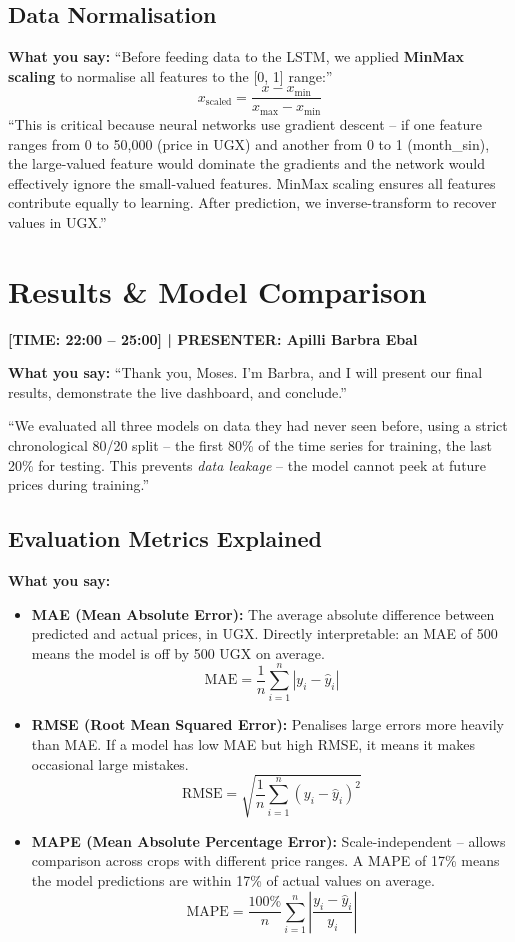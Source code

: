 \documentclass[11pt,a4paper]{article}
\begin{document}
\subsection{Data Normalisation}
\textbf{What you say:}
``Before feeding data to the LSTM, we applied \textbf{MinMax scaling} to normalise all features to the [0, 1] range:''
$$x_{\text{scaled}} = \frac{x - x_{\min}}{x_{\max} - x_{\min}}$$
``This is critical because neural networks use gradient descent -- if one feature ranges from 0 to 50,000 (price in UGX) and another from 0 to 1 (month\_sin), the large-valued feature would dominate the gradients and the network would effectively ignore the small-valued features. MinMax scaling ensures all features contribute equally to learning. After prediction, we inverse-transform to recover values in UGX.''

\newpage
\section{Results \& Model Comparison}
\textcolor{timecolor}{\textbf{[TIME: 22:00 -- 25:00] | PRESENTER: Apilli Barbra Ebal}}

\textbf{What you say:}
``Thank you, Moses. I'm Barbra, and I will present our final results, demonstrate the live dashboard, and conclude.''

``We evaluated all three models on data they had never seen before, using a strict chronological 80/20 split -- the first 80\% of the time series for training, the last 20\% for testing. This prevents \textit{data leakage} -- the model cannot peek at future prices during training.''

\subsection{Evaluation Metrics Explained}
\textbf{What you say:}
\begin{itemize}
    \item \textbf{MAE (Mean Absolute Error):} The average absolute difference between predicted and actual prices, in UGX. Directly interpretable: an MAE of 500 means the model is off by 500 UGX on average.
    $$\text{MAE} = \frac{1}{n}\sum_{i=1}^{n}|y_i - \hat{y}_i|$$
    \item \textbf{RMSE (Root Mean Squared Error):} Penalises large errors more heavily than MAE. If a model has low MAE but high RMSE, it means it makes occasional large mistakes.
    $$\text{RMSE} = \sqrt{\frac{1}{n}\sum_{i=1}^{n}(y_i - \hat{y}_i)^2}$$
    \item \textbf{MAPE (Mean Absolute Percentage Error):} Scale-independent -- allows comparison across crops with different price ranges. A MAPE of 17\% means the model predictions are within 17\% of actual values on average.
    $$\text{MAPE} = \frac{100\%}{n}\sum_{i=1}^{n}\left|\frac{y_i - \hat{y}_i}{y_i}\right|$$
\end{itemize}
\end{document}
